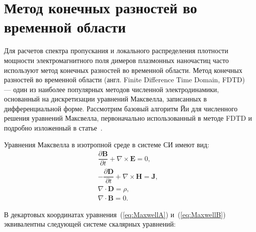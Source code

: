 \section{Метод конечных разностей во временной области}

Для расчетов спектра пропускания и локального распределения плотности мощности электромагнитного поля димеров плазмонных наночастиц часто используют метод конечных разностей во временной области. Метод конечных разностей во временной области (англ. Finite Difference Time Domain, FDTD) — один из наиболее популярных методов численной электродинамики, основанный на дискретизации уравнений Максвелла, записанных в дифференциальной форме. Рассмотрим базовый алгоритм Йи для численного решения уравнений Максвелла, первоначально использованный в методе FDTD и подробно изложенный в статье~\cite{FDTDYee}.

Уравнения Максвелла в изотропной среде в системе СИ имеют вид:
\begin{subequations}
\begin{gather}
\dfrac{\partial \textbf{B}}{\partial t} + \nabla \times \textbf{E} = 0, \label{eq:MaxwellA} \\
- \dfrac{\partial \textbf{D}}{\partial t} + \nabla \times \textbf{H} = \textbf{J}, \label{eq:MaxwellB} \\
\nabla \cdot \textbf{D} = \rho \label{eq:MaxwellC}, \\
\nabla \cdot \textbf{B} = 0 \label{eq:MaxwellD}.
\end{gather}
\end{subequations}

В декартовых координатах уравнения~(\ref{eq:MaxwellA}) и~(\ref{eq:MaxwellB}) эквивалентны следующей системе скалярных уравнений:

